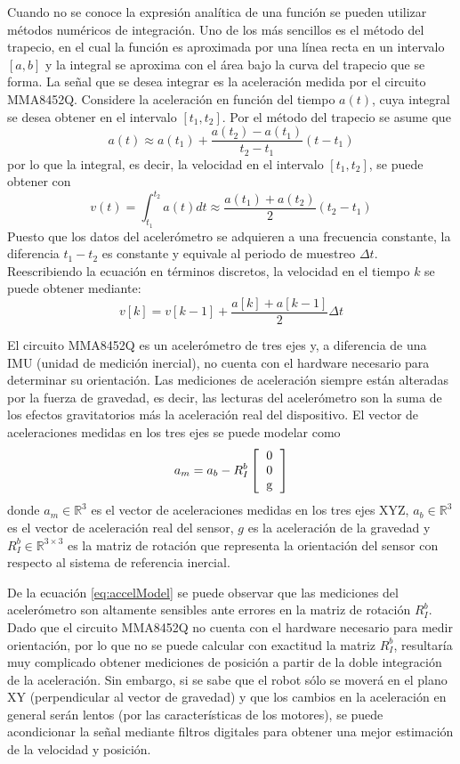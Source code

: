 \documentclass[a4paper,12pt]{article}
\begin{document}
Cuando no se conoce la expresión analítica de una función se pueden utilizar métodos numéricos de integración. Uno de los más sencillos es el método del trapecio, en el cual la función es aproximada por una línea recta en un intervalo $[a,b]$ y la integral se aproxima con el área bajo la curva del trapecio que se forma. La señal que se desea integrar es la aceleración medida por el circuito MMA8452Q. Considere la aceleración en función del tiempo $a(t)$, cuya integral se desea obtener en el intervalo $[t_1,t_2]$. Por el método del trapecio se asume que
\[a(t) \approx  a(t_1) + \frac{a(t_2) - a(t_1)}{t_2 - t_1}(t - t_1)\]
por lo que la integral, es decir, la velocidad en el intervalo $[t_1,t_2]$, se puede obtener con
\[v(t) = \int_{t_1}^{t_2} a(t)dt \approx \frac{a(t_1) + a(t_2)}{2}(t_2 - t_1)\]
Puesto que los datos del acelerómetro se adquieren a una frecuencia constante, la diferencia $t_1 - t_2$ es constante y equivale al periodo de muestreo $\Delta t$. Reescribiendo la ecuación en términos discretos, la velocidad en el tiempo $k$ se puede obtener mediante:
\begin{equation}
v[k] = v[k-1] + \frac{a[k] + a[k-1]}{2}\Delta t
\label{eq:Integral}
\end{equation}

El circuito MMA8452Q es un acelerómetro de tres ejes y, a diferencia de una IMU (unidad de medición inercial), no cuenta con el hardware necesario para determinar su orientación. Las mediciones de aceleración siempre están alteradas por la fuerza de gravedad, es decir, las lecturas del acelerómetro son la suma de los efectos gravitatorios más la aceleración real del dispositivo. El vector de aceleraciones medidas en los tres ejes se puede modelar como
\begin{equation}
  \label{eq:accelModel}
  a_m = a_b - R_I^b \left[\begin{tabular}{c}0\\0\\g \end{tabular}\right]
\end{equation}
donde $a_m \in \mathbb{R}^3$ es el vector de aceleraciones medidas en los tres ejes XYZ, $a_b \in \mathbb{R}^3$ es el vector de aceleración real del sensor, $g$ es la aceleración de la gravedad y $R_I^b \in \mathbb{R}^{3\times 3}$ es la matriz de rotación que representa la orientación del sensor con respecto al sistema de referencia inercial. 

De la ecuación \ref{eq:accelModel} se puede observar que las mediciones del acelerómetro son altamente sensibles ante errores en la matriz de rotación $R_I^b$. Dado que el circuito MMA8452Q no cuenta con el hardware necesario para medir orientación, por lo que no se puede calcular con exactitud la matriz $R_I^b$, resultaría muy complicado obtener mediciones de posición a partir de la doble integración de la aceleración. Sin embargo, si se sabe que el robot sólo se moverá en el plano XY (perpendicular al vector de gravedad) y que los cambios en la aceleración en general serán lentos (por las características de los motores), se puede acondicionar la señal mediante filtros digitales para obtener una mejor estimación de la velocidad y posición. 
\end{document}
